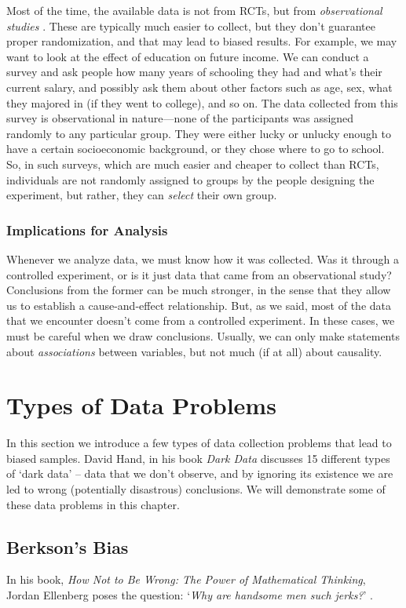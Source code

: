 Most of the time, the available data is not from RCTs, but from
\emph{observational studies} . These are typically much easier to collect, but they don't
guarantee proper randomization, and that may lead to biased results. 
For example, we may want to look at the effect of education on future income.
We can conduct a survey and ask people how many years of schooling they had
and what's their current salary, and possibly ask them about other factors such as age,
sex, what they majored in (if they went to college), and so on. The data collected 
from this survey is observational in nature---none of the participants was assigned randomly to 
any particular group. They were either lucky or unlucky enough to have a certain 
socioeconomic background, or they chose where to go to school.
So, in such surveys, which are much easier and cheaper to collect than RCTs,
individuals are not randomly assigned to groups by the people designing the experiment,
but rather, they can \emph{select} their own group. 

\subsubsection{Implications for Analysis}

Whenever we analyze data, we must know how it was collected. Was it through a
controlled experiment, or is it just data that came from an observational study?
Conclusions from the former can be much stronger, in the sense that they allow
us to establish a cause-and-effect relationship. But, as we said, most of the data
that we encounter doesn't come from a controlled experiment. In these cases, we
must be careful when we draw conclusions. Usually, we can only make statements
about \emph{associations} between variables, but not much (if at all) about
causality.

\section{Types of Data Problems}\label{types-data-problems}
In this section we introduce a few types of data collection problems that lead to
biased samples. 
David Hand, in his book \emph{Dark Data} \citep{darkdata_ch2} discusses 15 different
types of `dark data' -- data that we don't observe, and by ignoring its existence we 
are led to wrong (potentially disastrous) conclusions. 
We will demonstrate some of these data problems in this chapter.

\subsection{Berkson's Bias}\label{berkson-bias}
In his book, \textit{How Not to Be Wrong: The Power of Mathematical Thinking}, 
Jordan Ellenberg poses the question:
 `\textit{Why are handsome men such jerks?}' \citep{ellenberg2015not}.

